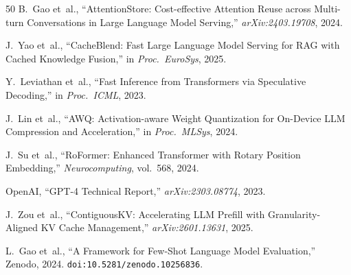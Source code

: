 \documentclass[conference]{IEEEtran}
\begin{document}
\begin{thebibliography}{50}
 B.~Gao et~al., ``AttentionStore: Cost-effective Attention Reuse across Multi-turn Conversations in Large Language Model Serving,'' \textit{arXiv:2403.19708}, 2024.

 J.~Yao et~al., ``CacheBlend: Fast Large Language Model Serving for RAG with Cached Knowledge Fusion,'' in \textit{Proc.\ EuroSys}, 2025.

 Y.~Leviathan et~al., ``Fast Inference from Transformers via Speculative Decoding,'' in \textit{Proc.\ ICML}, 2023.

 J.~Lin et~al., ``AWQ: Activation-aware Weight Quantization for On-Device LLM Compression and Acceleration,'' in \textit{Proc.\ MLSys}, 2024.

 J.~Su et~al., ``RoFormer: Enhanced Transformer with Rotary Position Embedding,'' \textit{Neurocomputing}, vol.~568, 2024.

 OpenAI, ``GPT-4 Technical Report,'' \textit{arXiv:2303.08774}, 2023.

 J.~Zou et~al., ``ContiguousKV: Accelerating LLM Prefill with Granularity-Aligned KV Cache Management,'' \textit{arXiv:2601.13631}, 2025.

 L.~Gao et~al., ``A Framework for Few-Shot Language Model Evaluation,'' Zenodo, 2024. \texttt{doi:10.5281/zenodo.10256836}.

\end{thebibliography}
\end{document}
